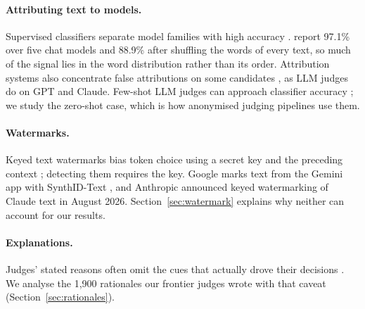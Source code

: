 \paragraph{Attributing text to models.}
Supervised classifiers separate model families with high accuracy
\citep{sun2025stylometric, bitton2025fingerprints, rosenfeld2026whose,
zaitsu2025stylometry, russell2026storyscope}. \citet{sun2025stylometric}
report 97.1\% over five chat models and 88.9\% after shuffling the words of
every text, so much of the signal lies in the word distribution rather than
its order. Attribution systems also concentrate false attributions on some
candidates \citep{alipoormolabashi2025maui}, as LLM judges do on GPT and
Claude. Few-shot LLM judges can approach classifier accuracy
\citep{dietrich2026splits}; we study the zero-shot case, which is how
anonymised judging pipelines use them.

\paragraph{Watermarks.}
Keyed text watermarks bias token choice using a secret key and the preceding
context \citep{kirchenbauer2023watermark, dathathri2024synthid}; detecting
them requires the key. Google marks text from the Gemini app with
SynthID-Text \citep{dathathri2024synthid}, and Anthropic announced keyed
watermarking of Claude text in August 2026. Section~\ref{sec:watermark}
explains why neither can account for our results.

\paragraph{Explanations.}
Judges' stated reasons often omit the cues that actually drove their
decisions \citep{marioriyad2025silent}. We analyse the 1,900 rationales our
frontier judges wrote with that caveat (Section~\ref{sec:rationales}).
